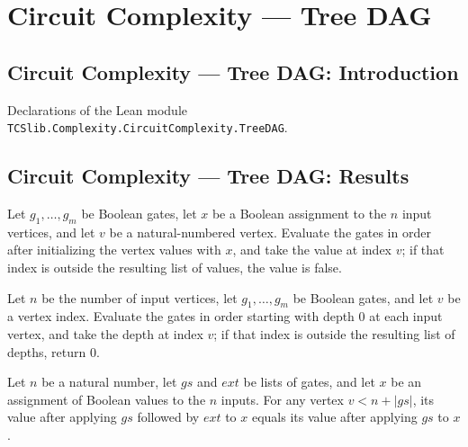 \section{Circuit Complexity --- Tree DAG}
\subsection*{Circuit Complexity --- Tree DAG: Introduction}

Declarations of the Lean module \texttt{TCSlib.Complexity.CircuitComplexity.TreeDAG}.

\subsection*{Circuit Complexity --- Tree DAG: Results}

\begin{definition}
\label{BoolCircuit.vertexValue}
\leanok
{}
Let $g_1,\ldots,g_m$ be Boolean gates, let $x$ be a Boolean assignment to the $n$ input
vertices, and let $v$ be a natural-numbered vertex. Evaluate the gates in order after
initializing the vertex values with $x$, and take the value at index $v$; if that index
is outside the resulting list of values, the value is false.
\end{definition}

\begin{definition}
\label{BoolCircuit.vertexDepth}
\leanok
{}
Let $n$ be the number of input vertices, let $g_1,\ldots,g_m$ be Boolean gates, and let
$v$ be a vertex index. Evaluate the gates in order starting with depth $0$ at each input
vertex, and take the depth at index $v$; if that index is outside the resulting list of
depths, return $0$.
\end{definition}

\begin{theorem}
\label{BoolCircuit.vertexValue_append}
\leanok
{}
Let $n$ be a natural number, let $gs$ and $ext$ be lists of gates, and let $x$ be an
assignment of Boolean values to the $n$ inputs. For any vertex $v<n+|gs|$, its value
after applying $gs$ followed by $ext$ to $x$ equals its value after applying $gs$ to
$x$.
\end{theorem}

